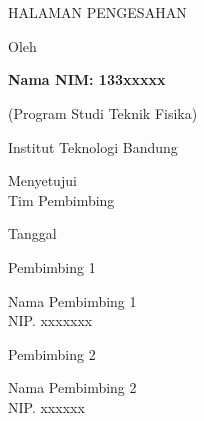 \clearpage
\chapter*{} %

\begin{center}
	\begin{singlespace}
		\large \bfseries \MakeUppercase{\thetitle}
		
		\large \MakeUppercase{Halaman Pengesahan}
		
		\vspace{15mm}
		
		\normalsize \normalfont 
		Oleh
		
		\bfseries
		Nama \hspace{5mm} NIM: 133xxxxx
		
		(Program Studi Teknik Fisika) \\
		
		\vspace{10mm}
		
		\normalsize \normalfont 
		Institut Teknologi Bandung \\
		
		\vspace{20mm}
		
		Menyetujui\\
		Tim Pembimbing
		
		\vspace{10mm}
		
		Tanggal \dateofapproval
		
		\vspace{0.5cm}
		
		\begin{multicols}{2}
			Pembimbing 1
			
			\vspace{25mm}
			
			Nama Pembimbing 1\\
			NIP. xxxxxxx
			
			\columnbreak
			
			
			Pembimbing 2
			
			\vspace{25mm}
			
			Nama Pembimbing 2\\
			NIP. xxxxxx
		\end{multicols}
	\end{singlespace}
\end{center}
\clearpage
